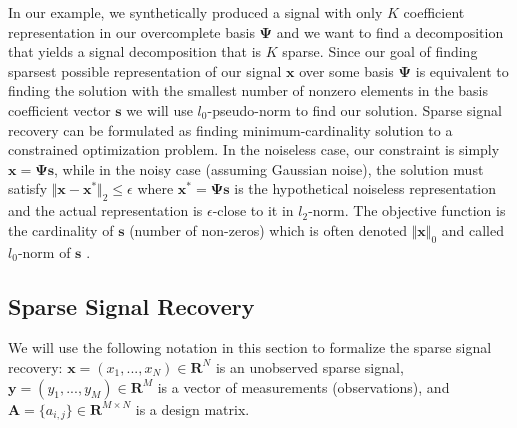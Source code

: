 \documentclass[journal]{IEEEtran}
\begin{document}
In our example, we synthetically produced a signal with only $K$ coefficient representation in our overcomplete basis $\boldsymbol{\Psi}$ and we want to find a decomposition that yields a signal decomposition that is $K$ sparse. Since our goal of finding sparsest possible representation of our signal $\boldsymbol{x}$ over some basis $\boldsymbol{\Psi}$ is equivalent to finding the solution with the smallest number of nonzero elements in the basis coefficient vector $\boldsymbol{s}$ we will use $l_0$-pseudo-norm to find our solution. Sparse signal recovery can be formulated as finding minimum-cardinality solution to a constrained optimization problem. In the noiseless case, our constraint is simply $\boldsymbol{x}=\boldsymbol{\Psi} \boldsymbol{s}$, while in the noisy case (assuming Gaussian noise), the solution must satisfy $\Vert \boldsymbol{x}-\boldsymbol{x^*}\Vert_2\leq\epsilon$ where $\boldsymbol{x^*}=\boldsymbol{\Psi} \boldsymbol{s}$ is the hypothetical noiseless representation and the actual representation is $\epsilon$-close to it in $l_2$-norm. The objective function is the cardinality of $\boldsymbol{s}$ (number of non-zeros) which is often denoted $\Vert \boldsymbol{x}\Vert_0$ and called $l_0$-norm of $\boldsymbol{s}$ \cite{romberg}. 

\subsection{Sparse Signal Recovery}
We will use the following notation in this section to formalize the sparse signal recovery: $\boldsymbol{x}=(x_1,...,x_N)\in \mathbf{R}^N$ is an unobserved sparse signal, $\boldsymbol{y}=(y_1,...,y_M)\in \mathbf{R}^M$ is a vector of measurements (observations), and $\boldsymbol{A}=\{a_{i,j}\}\in\mathbf{R}^{M\times N}$ is a design matrix. 
\end{document}
